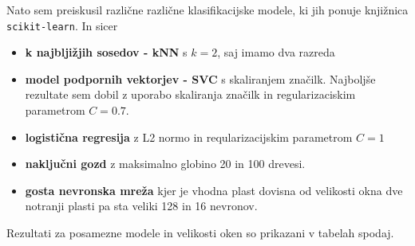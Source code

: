 \documentclass[11pt,a4paper]{article}
\begin{document}
Nato sem preiskusil različne različne klasifikacijske modele, ki jih ponuje knjižnica \texttt{scikit-learn}. In sicer
\begin{itemize}
    \item \textbf{k najbljižjih sosedov - kNN}  s $k=2$, saj imamo dva razreda  
    \item \textbf{model podpornih vektorjev - SVC}  s skaliranjem značilk. Najboljše rezultate sem dobil z uporabo skaliranja značilk in regularizaciskim parametrom $C=0.7$.
    \item \textbf{logistična regresija}  z L2 normo in reqularizacijskim parametrom $C=1$
    \item \textbf{naključni gozd}  z maksimalno globino 20 in 100 drevesi.
    \item \textbf{gosta nevronska mreža}  kjer je vhodna plast dovisna od velikosti okna dve notranji plasti pa sta veliki 128 in 16 nevronov.
\end{itemize}

Rezultati za posamezne modele in velikosti oken so prikazani v tabelah spodaj. 
\end{document}
